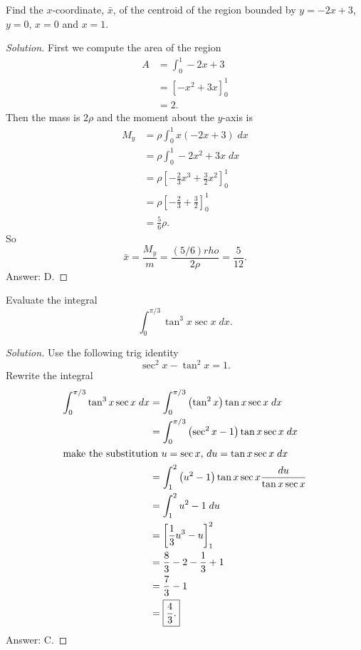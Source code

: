 \begin{problem}
Find the $x$-coordinate, $\bar x$, of the centroid of the region bounded by
$y=-2x+3$, $y=0$, $x=0$ and $x=1$.
\end{problem}
\begin{proof}[Solution]
First we compute the area of the region
\begin{align*}
A&=\int_0^1-2x+3\\
 &=\left[-x^2+3x\right]_0^1\\
 &=2.
\end{align*}
Then the mass is $2\rho $ and the moment about the $y$-axis is
\begin{align*}
M_y&=\rho\int_0^1 x(-2x+3)\;dx\\
   &=\rho\int_0^1 -2x^2+3x\;dx\\
   &=\rho\left[-\frac{2}{3}x^3+\frac{3}{2}x^2\right]_0^1\\
   &=\rho\left[-\frac{2}{3}+\frac{3}{2}\right]_0^1\\
   &=\frac{5}{6}\rho.
\end{align*}
So
\[
\bar x=\frac{M_y}{m}=\frac{(5/6)rho}{2\rho}=\boxed{\frac{5}{12}.}
\]
Answer: {\color{Red} D}.
\end{proof}

\begin{problem}[{\color{Red} \#}, {\color{Green} \#}]
Evaluate the integral
\[
\int_0^{\pi/3}\tan^3 x\sec x\;dx.
\]
\end{problem}
\begin{proof}[Solution]
Use the following trig identity
\[
\sec^2 x-\tan ^2x=1.
\]
Rewrite the integral
\begin{align*}
\int_0^{\pi/3}\tan^3 x\sec x\;dx
&=\int_0^{\pi/3}\left(\tan^2 x\right)\tan x\sec x\;dx\\
&=\int_0^{\pi/3}\left(\sec^2 x-1\right)\tan x\sec x\;dx\\
\intertext{make the substitution $u=\sec x$, $du =\tan x\sec x\;dx$}
&=\int_1^2\left(u^2-1\right)\tan x\sec x\frac{du}{\tan x\sec x}\\
&=\int_1^2 u^2-1\;du\\
&=\left[\frac{1}{3}u^3-u \right]_1^2\\
&=\frac{8}{3}-2-\frac{1}{3}+1\\
&=\frac{7}{3}-1\\
&=\boxed{\frac{4}{3}.}
\end{align*}
Answer: {\color{Red} C.}
\end{proof}

